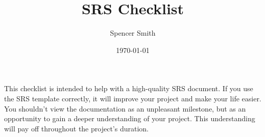 \documentclass[12pt]{article}
\newcommand{\cmark}{\ding{51}}%
\newcommand{\xmark}{\ding{55}}%
\newcommand{\done}{\rlap{$\square$}{\raisebox{2pt}{\large\hspace{1pt}\cmark}}%
\hspace{-2.5pt}}
\newcommand{\wontfix}{\rlap{$\square$}{\large\hspace{1pt}\xmark}}
\begin{document}
\title{SRS Checklist}
\author{Spencer Smith}
\date{\today}

\maketitle


This checklist is intended to help with a high-quality SRS document. If you use
the SRS template correctly, it will improve your project and make your life
easier. You shouldn't view the documentation as an unpleasant milestone, but as
an opportunity to gain a deeper understanding of your project. This
understanding will pay off throughout the project's duration.
\end{document}

